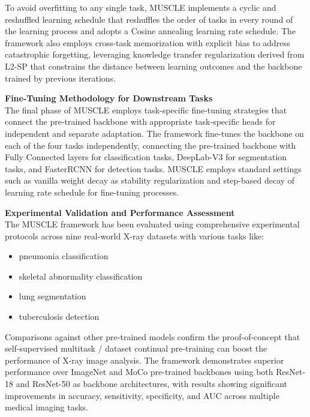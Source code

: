 \documentclass{IEEEcsmag}
\begin{document}
    To avoid overfitting to any single task, MUSCLE implements a cyclic and reshuffled learning schedule that reshuffles the order of tasks in every round of the learning process and adopts a Cosine annealing learning rate schedule\cite{cite-17}. 
    The framework also employs cross-task memorization with explicit bias to address catastrophic forgetting, leveraging knowledge transfer regularization derived from L2-SP that constrains the distance between learning outcomes and the backbone trained by previous iterations\cite{cite-17}.
    
    \textbf{Fine-Tuning Methodology for Downstream Tasks}\\
    The final phase of MUSCLE employs task-specific fine-tuning strategies that connect the pre-trained backbone with appropriate task-specific heads for independent and separate adaptation.
    The framework fine-tunes the backbone on each of the four tasks independently, connecting the pre-trained backbone with Fully Connected layers for classification tasks, DeepLab-V3 for segmentation tasks, and FasterRCNN for detection tasks\cite{cite-17}. MUSCLE employs standard settings such as vanilla weight decay as stability regularization and step-based decay of learning rate schedule for fine-tuning processes\cite{cite-17}.
    
    \textbf{Experimental Validation and Performance Assessment}\\
    The MUSCLE framework has been evaluated using comprehensive experimental protocols across nine real-world X-ray datasets with various tasks like:
    \begin{itemize}
        \item pneumonia classification
        \item skeletal abnormality classification
        \item lung segmentation
        \item tuberculosis detection
    \end{itemize} 
    Comparisons against other pre-trained models confirm the proof-of-concept that self-supervised multitask / dataset continual pre-training can boost the performance of X-ray image analysis\cite{cite-17}. 
    The framework demonstrates superior performance over ImageNet and MoCo pre-trained backbones using both ResNet-18 and ResNet-50 as backbone architectures, with results showing significant improvements in accuracy, sensitivity, specificity, and AUC across multiple medical imaging tasks.
    
\end{document}
